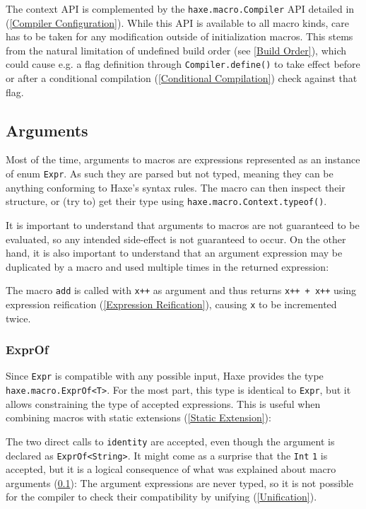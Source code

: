 \documentclass{article}
\newcommand{\type}[1]{\texttt{#1}}
\newcommand{\expr}[1]{\texttt{#1}}
\newcommand{\fullref}[1]{\nameref{#1} (\cref{#1})}
\begin{document}
The context API is complemented by the \expr{haxe.macro.Compiler} API detailed in \fullref{Compiler Configuration}. While this API is available to all macro kinds, care has to be taken for any modification outside of initialization macros. This stems from the natural limitation of undefined build order (see \ref{Build Order}), which could cause e.g. a flag definition through \expr{Compiler.define()} to take effect before or after a conditional compilation (\ref{Conditional Compilation}) check against that flag.

\subsection{Arguments}
\label{Macro Arguments}

Most of the time, arguments to macros are expressions represented as an instance of enum \type{Expr}. As such they are parsed but not typed, meaning they can be anything conforming to Haxe's syntax rules. The macro can then inspect their structure, or (try to) get their type using \expr{haxe.macro.Context.typeof()}.

It is important to understand that arguments to macros are not guaranteed to be evaluated, so any intended side-effect is not guaranteed to occur. On the other hand, it is also important to understand that an argument expression may be duplicated by a macro and used multiple times in the returned expression:



The macro \expr{add} is called with \expr{x++} as argument and thus returns \expr{x++ + x++} using expression reification (\ref{Expression Reification}), causing \expr{x} to be incremented twice.

\subsubsection{ExprOf}

Since \type{Expr} is compatible with any possible input, Haxe provides the type \type{haxe.macro.ExprOf<T>}. For the most part, this type is identical to \type{Expr}, but it allows constraining the type of accepted expressions. This is useful when combining macros with static extensions (\ref{Static Extension}):



The two direct calls to \expr{identity} are accepted, even though the argument is declared as \expr{ExprOf<String>}. It might come as a surprise that the \type{Int} \expr{1} is accepted, but it is a logical consequence of what was explained about macro arguments (\ref{Macro Arguments}): The argument expressions are never typed, so it is not possible for the compiler to check their compatibility by unifying (\ref{Unification}).
\end{document}
